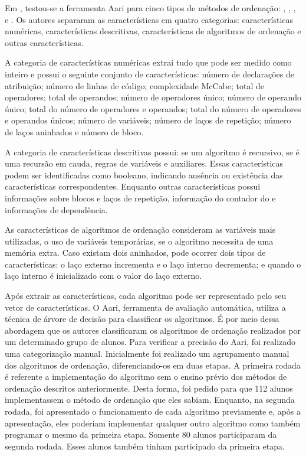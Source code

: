 	    Em , testou-se a ferramenta Aari para cinco tipos
	    de métodos de ordenação: , ,
	    ,  e . Os autores
		separaram as características em quatro categorias: características numéricas,
		características descritivas, características de algoritmos de ordenação e
		outras características.
	    
	    A categoria de características numéricas extrai tudo que pode ser medido
	    como inteiro e possui o seguinte conjunto de características: número de
	    declarações de atribuição; número de linhas de código; complexidade McCabe;
		total de operadores; total de operandos; número de operadores único; número
		de operando único; total do número de operadores e operandos; total do número
		de operadores e operandos únicos; número de variáveis; número de laços de
	    repetição; número de laços aninhados e número de bloco.
	    
	    A categoria de características descritivas possui: se um algoritmo é
	    recursivo, se é uma recursão em cauda, regras de variáveis e 
	    auxiliares. Essas características podem ser identificadas como booleano,
	    indicando ausência ou existência das características correspondentes. Enquanto
	    outras características possui informações sobre blocos e laços de repetição,
	    informação do contador do  e informações de dependência.
	    
	    As características de algoritmos de ordenação consideram as variáveis mais
	    utilizadas, o uso de variáveis temporárias, se o algoritmo necessita de uma
	    memória extra. Caso existam dois  aninhados, pode ocorrer
	    dois tipos de características: o laço externo incrementa e o laço interno
	    decrementa; e quando o laço interno é inicializado com o valor do laço externo. 
	    
	    Após extrair as características, cada algoritmo pode ser representado pelo seu
	    vetor de características. O Aari, ferramenta de avaliação automática, utiliza
		a técnica de árvore de decisão para classificar os algoritmos. É por meio
		dessa abordagem que os autores classificaram os algoritmos de ordenação
		realizados por um determinado grupo de alunos. Para verificar a precisão do
		Aari, foi realizado uma categorização manual. Inicialmente foi realizado um
		agrupamento manual dos algoritmos de ordenação, diferenciando-os em duas
		etapas. A primeira rodada é referente a implementação do algoritmo sem o
		ensino prévio dos métodos de ordenação descritos anteriormente. Desta
		forma, foi pedido para que 112 alunos implementassem o método de ordenação
		que eles sabiam. Enquanto, na segunda rodada, foi apresentado o funcionamento
		de cada algoritmo previamente e, após a apresentação, eles poderiam implementar
		qualquer outro algoritmo como também programar o mesmo da primeira etapa.
		Somente 80 alunos participaram da segunda rodada. Esses alunos também tinham
		participado da primeira etapa.
		
